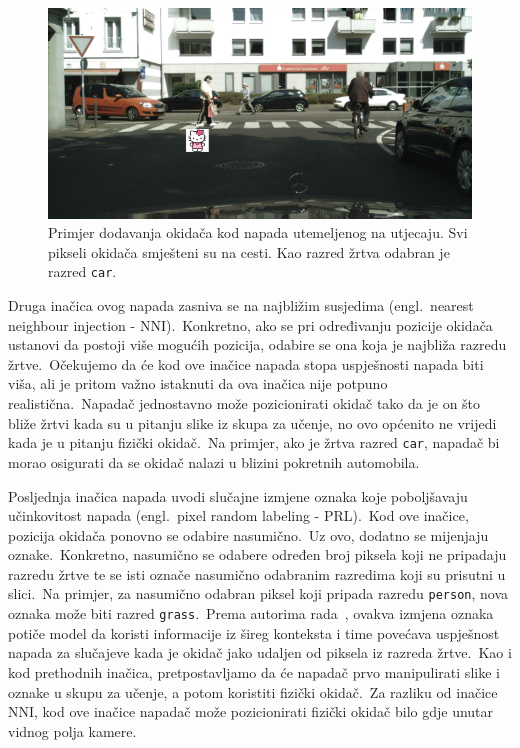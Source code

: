 \documentclass[times, utf8, seminar, numeric]{fer}
\begin{document}
\begin{figure}[h]
    \centering
    \includegraphics[scale=0.75]{./Slike/iba.png}
    \caption{Primjer dodavanja okidača kod napada utemeljenog na utjecaju. Svi pikseli okidača smješteni su na cesti. Kao razred žrtva odabran je razred \texttt{car}.}
    \label{fig:iba}
\end{figure}

\pagebreak

Druga inačica ovog napada zasniva se na najbližim susjedima (engl.\ nearest neighbour injection - NNI).\ 
Konkretno, ako se pri određivanju pozicije okidača ustanovi da postoji više mogućih pozicija, odabire se ona koja je najbliža razredu žrtve.\ 
Očekujemo da će kod ove inačice napada stopa uspješnosti napada biti viša, ali je pritom važno istaknuti da ova inačica nije potpuno realistična.\ 
Napadač jednostavno može pozicionirati okidač tako da je on što bliže žrtvi kada su u pitanju slike iz skupa za učenje, no ovo općenito ne vrijedi kada je u pitanju fizički okidač.\ 
Na primjer, ako je žrtva razred \texttt{car}, napadač bi morao osigurati da se okidač nalazi u blizini pokretnih automobila.\
  
Posljednja inačica napada uvodi slučajne izmjene oznaka koje poboljšavaju učinkovitost napada (engl.\ pixel random labeling - PRL).\
Kod ove inačice, pozicija okidača ponovno se odabire nasumično.\ Uz ovo, dodatno se mijenjaju oznake.\ 
Konkretno, nasumično se odabere određen broj piksela koji ne pripadaju razredu žrtve te se isti označe nasumično odabranim razredima koji su prisutni u slici.\ 
Na primjer, za nasumično odabran piksel koji pripada razredu \texttt{person}, nova oznaka može biti razred \texttt{grass}.\ 
Prema autorima rada~\cite{lan2023influencer}, ovakva izmjena oznaka potiče model da koristi informacije iz šireg konteksta i time povećava uspješnost napada za slučajeve kada je okidač jako udaljen od piksela iz razreda žrtve.\ 
Kao i kod prethodnih inačica, pretpostavljamo da će napadač prvo manipulirati slike i oznake u skupu za učenje, a potom koristiti fizički okidač.\ 
Za razliku od inačice NNI, kod ove inačice napadač može pozicionirati fizički okidač bilo gdje unutar vidnog polja kamere.\  
\end{document}
